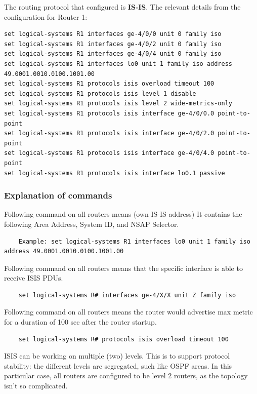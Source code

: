 \documentclass[a4paper]{article}
\begin{document}
The routing protocol that configured is \textbf{IS-IS}. The relevant details from the configuration for Router 1:

\begin{verbatim}
set logical-systems R1 interfaces ge-4/0/0 unit 0 family iso
set logical-systems R1 interfaces ge-4/0/2 unit 0 family iso
set logical-systems R1 interfaces ge-4/0/4 unit 0 family iso
set logical-systems R1 interfaces lo0 unit 1 family iso address 49.0001.0010.0100.1001.00
set logical-systems R1 protocols isis overload timeout 100
set logical-systems R1 protocols isis level 1 disable
set logical-systems R1 protocols isis level 2 wide-metrics-only
set logical-systems R1 protocols isis interface ge-4/0/0.0 point-to-point
set logical-systems R1 protocols isis interface ge-4/0/2.0 point-to-point
set logical-systems R1 protocols isis interface ge-4/0/4.0 point-to-point
set logical-systems R1 protocols isis interface lo0.1 passive
\end{verbatim}


\subsubsection{Explanation of commands}

Following command on all routers means (own IS-IS address) It contains the following Area Address, System ID, and NSAP Selector.

\begin{verbatim}
    Example: set logical-systems R1 interfaces lo0 unit 1 family iso address 49.0001.0010.0100.1001.00
\end{verbatim}

Following command on all routers means that the specific interface is able to receive ISIS PDUs.

\begin{verbatim}
    set logical-systems R# interfaces ge-4/X/X unit Z family iso 
\end{verbatim}


Following command on all routers means the router would advertise max metric for a duration of 100 sec after the router startup.

\begin{verbatim}    
    set logical-systems R# protocols isis overload timeout 100
\end{verbatim}

ISIS can be working on multiple (two) levels. This is to support protocol stability: the different levels are segregated, such like OSPF areas. In this particular case, all routers are configured to be level 2 routers, as the topology isn't so complicated.
\end{document}
